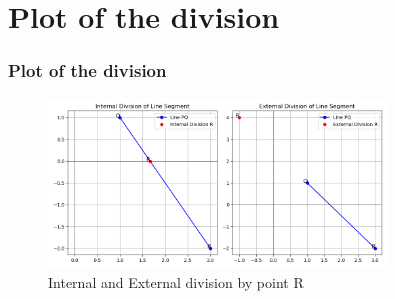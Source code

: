 \documentclass{beamer}
\theoremstyle{remark}
\numberwithin{equation}{section}
\begin{document}
\section{Plot of the division}
\begin{frame}
	\frametitle{Plot of the division}
	\begin{figure}[H]
		\centering
		\includegraphics[width=0.8\textwidth]{figs/fig.png}
		\caption{Internal and External division by point R}
	\end{figure}   
\end{frame}
\end{document}
